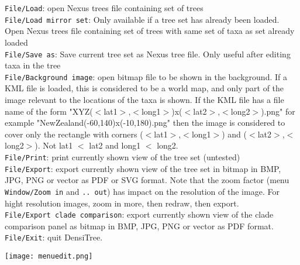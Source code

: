 \documentclass{article}
\def\DensiTree{DensiTree}
\begin{document}
\noindent
{\tt File/Load}: open Nexus trees file containing set of trees\\
{\tt File/Load mirror set}: Only available if a tree set has already been loaded.
Open Nexus trees file containing set of trees with same set of taxa as set already loaded\\
{\tt File/Save as}: Save current tree set as Nexus tree file. Only useful after editing taxa in the tree\\
{\tt File/Background image}: open bitmap file to be shown in the background. If a KML file is
loaded, this is considered to be a world map, and only part of the image relevant to the locations
of the taxa is shown. If the KML file has a file name of the form "XYZ($<$lat1$>$,$<$long1$>$)x($<$lat2$>$,$<$long2$>$).png"
for example "NewZealand(-60,140)x(-10,180).png"
then the image is considered to cover only the rectangle with corners  ($<$lat1$>$,$<$long1$>$) and 
($<$lat2$>$,$<$long2$>$). Not lat1 $<$ lat2 and long1 $<$ long2.\\
{\tt File/Print}: print currently shown view of the tree set (untested)\\
{\tt File/Export}: export currently shown view of the tree set in bitmap in BMP, JPG, PNG or vector as PDF or SVG
format.
Note that the zoom factor (menu {\tt Window/Zoom in} and {\tt .. out}) has impact on the resolution 
of the image. For hight resolution images, zoom in more, then redraw, then export.\\
{\tt File/Export clade comparison}: export currently shown view of the clade comparison panel as bitmap in BMP, JPG, PNG or 
vector as PDF format.
{\tt File/Exit}: quit \DensiTree.

\begin{center}
\texttt{[image: menuedit.png]}
\end{center}
\end{document}
